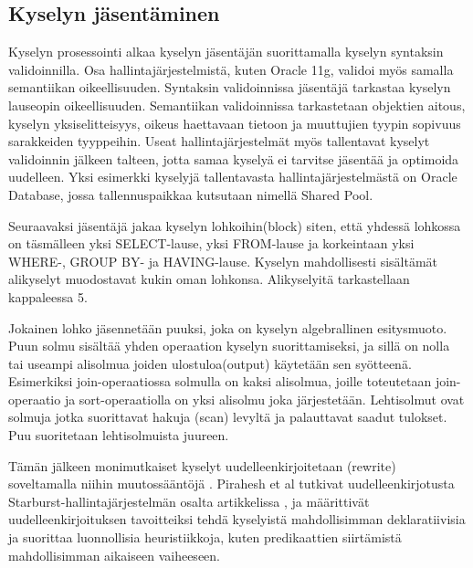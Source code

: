 \documentclass[finnish]{tktltiki2}
\theoremstyle{definition}
\theoremstyle{remark}
\begin{document}
\subsection{Kyselyn jäsentäminen}
Kyselyn prosessointi alkaa kyselyn jäsentäjän suorittamalla kyselyn syntaksin validoinnilla. \cite{selinger1979access} Osa hallintajärjestelmistä, kuten Oracle 11g, validoi myös samalla semantiikan oikeellisuuden. \cite{oracle2009doc}
Syntaksin validoinnissa jäsentäjä tarkastaa kyselyn lauseopin oikeellisuuden. Semantiikan validoinnissa tarkastetaan objektien aitous, kyselyn yksiselitteisyys, oikeus haettavaan tietoon ja muuttujien tyypin sopivuus sarakkeiden tyyppeihin. Useat hallintajärjestelmät myös
tallentavat kyselyt validoinnin jälkeen talteen, jotta samaa kyselyä ei tarvitse jäsentää ja optimoida uudelleen. Yksi esimerkki kyselyjä tallentavasta hallintajärjestelmästä on Oracle Database, jossa tallennuspaikkaa kutsutaan nimellä Shared Pool. \cite{oracle2005doc}

Seuraavaksi jäsentäjä jakaa kyselyn lohkoihin(block) siten, että yhdessä lohkossa on täsmälleen yksi SELECT-lause, yksi FROM-lause ja korkeintaan yksi WHERE-, GROUP BY- ja HAVING-lause. \cite{ramakrishnan2003database}
Kyselyn mahdollisesti sisältämät alikyselyt muodostavat kukin oman lohkonsa. Alikyselyitä tarkastellaan kappaleessa 5.

Jokainen lohko jäsennetään puuksi, joka on kyselyn algebrallinen esitysmuoto. \cite{mahajan2012}
Puun solmu sisältää yhden operaation kyselyn suorittamiseksi, ja sillä on nolla tai useampi alisolmua joiden ulostuloa(output) käytetään sen syötteenä.
Esimerkiksi join-operaatiossa solmulla on kaksi alisolmua, joille toteutetaan join-operaatio ja sort-operaatiolla on yksi alisolmu joka järjestetään.
Lehtisolmut ovat solmuja jotka suorittavat hakuja (scan) levyltä ja palauttavat saadut tulokset. 
Puu suoritetaan lehtisolmuista juureen.

Tämän jälkeen monimutkaiset kyselyt uudelleenkirjoitetaan (rewrite) soveltamalla niihin muutossääntöjä \cite{ioannidis1996query}. Pirahesh et al tutkivat uudelleenkirjotusta Starburst-hallintajärjestelmän osalta artikkelissa \cite{pirahesh1992extensible}, ja määrittivät uudelleenkirjoituksen tavoitteiksi tehdä kyselyistä mahdollisimman deklaratiivisia ja suorittaa luonnollisia heuristiikkoja, kuten predikaattien siirtämistä mahdollisimman aikaiseen vaiheeseen.

\end{document}
